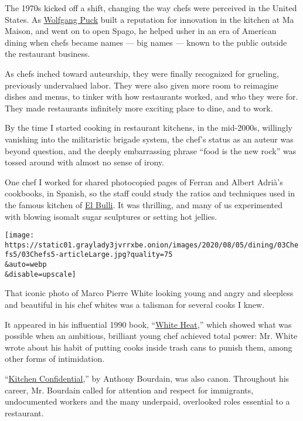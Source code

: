 The 1970s kicked off a shift, changing the way chefs were perceived in
the United States. As
\href{https://www.nytimes3xbfgragh.onion/2012/10/31/dining/wolfgang-puck-the-original-celebrity-chef-is-still-keeping-busy.html}{Wolfgang
Puck} built a reputation for innovation in the kitchen at Ma Maison, and
went on to open Spago, he helped usher in an era of American dining when
chefs became names --- big names --- known to the public outside the
restaurant business.

As chefs inched toward auteurship, they were finally recognized for
grueling, previously undervalued labor. They were also given more room
to reimagine dishes and menus, to tinker with how restaurants worked,
and who they were for. They made restaurants infinitely more exciting
place to dine, and to work.

By the time I started cooking in restaurant kitchens, in the mid-2000s,
willingly vanishing into the militaristic brigade system, the chef's
status as an auteur was beyond question, and the deeply embarrassing
phrase ``food is the new rock'' was tossed around with almost no sense
of irony.

One chef I worked for shared photocopied pages of Ferran and Albert
Adrià's cookbooks, in Spanish, so the staff could study the ratios and
techniques used in the famous kitchen of
\href{https://www.nytimes3xbfgragh.onion/2010/09/22/dining/reviews/22pour.html}{El
Bulli}. It was thrilling, and many of us experimented with blowing
isomalt sugar sculptures or setting hot jellies.

\texttt{[image: https://static01.graylady3jvrrxbe.onion/images/2020/08/05/dining/03Chefs5/03Chefs5-articleLarge.jpg?quality=75\\\&auto=webp\\\&disable=upscale]}

That iconic photo of Marco Pierre White looking young and angry and
sleepless and beautiful in his chef whites was a talisman for several
cooks I knew.

It appeared in his influential 1990 book,
``\href{https://www.nytimes3xbfgragh.onion/2015/04/08/dining/marco-pierre-white-white-heat-a-game-changer-revisited.html}{White
Heat},'' which showed what was possible when an ambitious, brilliant
young chef achieved total power: Mr. White wrote about his habit of
putting cooks inside trash cans to punish them, among other forms of
intimidation.

``\href{https://www.harpercollins.com/products/kitchen-confidential-updated-ed-anthony-bourdain}{Kitchen
Confidential},'' by Anthony Bourdain, was also canon. Throughout his
career, Mr. Bourdain called for attention and respect for immigrants,
undocumented workers and the many underpaid, overlooked roles essential
to a restaurant.

